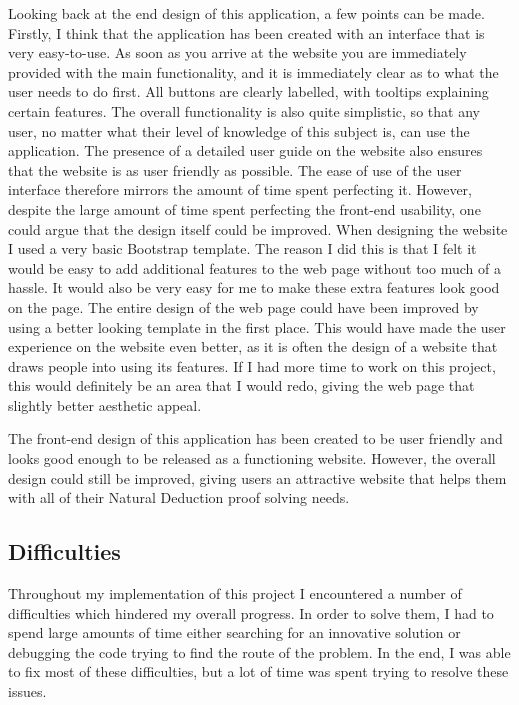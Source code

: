 Looking back at the end design of this application, a few points can be made. Firstly, I think that the application has been created with an interface that is very easy-to-use. As soon as you arrive at the website you are immediately provided with the main functionality, and it is immediately clear as to what the user needs to do first. All buttons are clearly labelled, with tooltips explaining certain features. The overall functionality is also quite simplistic, so that any user, no matter what their level of knowledge of this subject is, can use the application. The presence of a detailed user guide on the website also ensures that the website is as user friendly as possible. The ease of use of the user interface therefore mirrors the amount of time spent perfecting it. However, despite the large amount of time spent perfecting the front-end usability, one could argue that the design itself could be improved. When designing the website I used a very basic Bootstrap template. The reason I did this is that I felt it would be easy to add additional features to the web page without too much of a hassle. It would also be very easy for me to make these extra features look good on the page. The entire design of the web page could have been improved by using a better looking template in the first place. This would have made the user experience on the website even better, as it is often the design of a website that draws people into using its features. If I had more time to work on this project, this would definitely be an area that I would redo, giving the web page that slightly better aesthetic appeal.

The front-end design of this application has been created to be user friendly and looks good enough to be released as a functioning website. However, the overall design could still be improved, giving users an attractive website that helps them with all of their Natural Deduction proof solving needs.

\subsection{Difficulties \label{difficulties}}

Throughout my implementation of this project I encountered a number of difficulties which hindered my overall progress. In order to solve them, I had to spend large amounts of time either searching for an innovative solution or debugging the code trying to find the route of the problem. In the end, I was able to fix most of these difficulties, but a lot of time was spent trying to resolve these issues.

